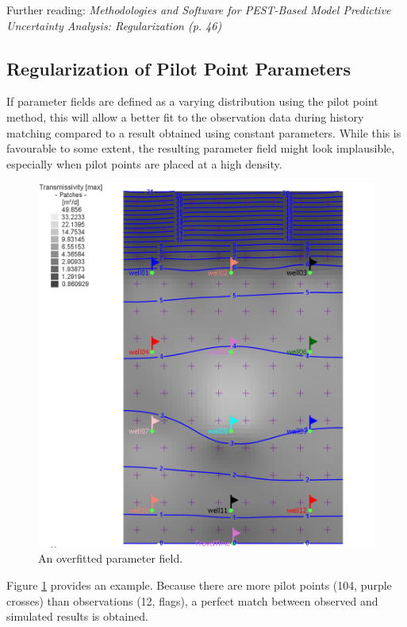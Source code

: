 Further reading: \textit{Methodologies and Software for PEST-Based Model Predictive Uncertainty Analysis: Regularization (p. 46)}


\subsection{Regularization of Pilot Point Parameters}

If parameter fields are defined as a varying distribution using the pilot point method, this will allow a better fit to the observation data during history matching compared to a result obtained using constant parameters. While this is favourable to some extent, the resulting parameter field might look implausible, especially when pilot points are placed at a high density.

\begin{figure}
	\center
	\includegraphics[width=\columnwidth]{figures/CondHeadCalib1.png}
\caption{An overfitted parameter field.}
\label{fig:fepest:CondHeadCalib1}
\end{figure}

Figure \ref{fig:fepest:CondHeadCalib1} provides an example. Because there are more pilot points (104, purple crosses) than observations (12, flags), a perfect match between observed and simulated results is obtained. 

